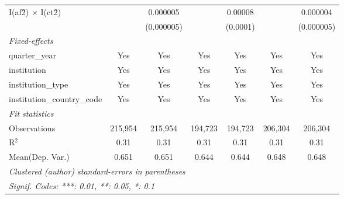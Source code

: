 \begin{tabular}{lcccccc}
   I(af\^2) $\times$ I(ct\^2)         &               & 0.000005       &               & 0.00008       &               & 0.000004\\   
                                      &               & (0.000005)     &               & (0.0001)      &               & (0.000005)\\   
   \midrule
   \emph{Fixed-effects}\\
   quarter\_year                      & Yes           & Yes            & Yes           & Yes           & Yes           & Yes\\  
   institution                        & Yes           & Yes            & Yes           & Yes           & Yes           & Yes\\  
   institution\_type                  & Yes           & Yes            & Yes           & Yes           & Yes           & Yes\\  
   institution\_country\_code         & Yes           & Yes            & Yes           & Yes           & Yes           & Yes\\  
   \midrule
   \emph{Fit statistics}\\
   Observations                       & 215,954       & 215,954        & 194,723       & 194,723       & 206,304       & 206,304\\  
   R$^2$                              & 0.31          & 0.31           & 0.31          & 0.31          & 0.31          & 0.31\\  
Mean(Dep. Var.) & 0.651 & 0.651 & 0.644 & 0.644 & 0.648 & 0.648 \\
   \midrule \midrule
   \multicolumn{7}{l}{\emph{Clustered (author) standard-errors in parentheses}}\\
   \multicolumn{7}{l}{\emph{Signif. Codes: ***: 0.01, **: 0.05, *: 0.1}}\\
\end{tabular}
\par\endgroup
